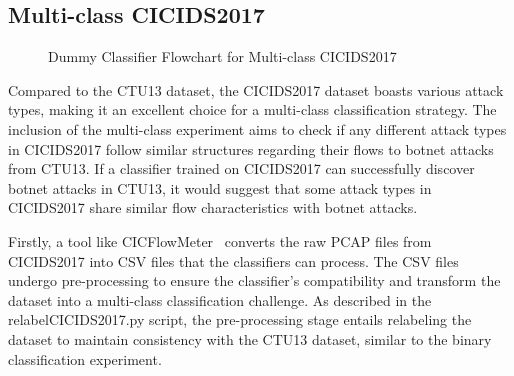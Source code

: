 \subsection{Multi-class CICIDS2017}\label{subsec:DummyClassifierMultiCICIDS2017}

\begin{figure}[H]
\centering
{}
\caption{Dummy Classifier Flowchart for Multi-class CICIDS2017}\label{fig:DummyRandomFlowMultiCICIDS2017}
\end{figure}

Compared to the CTU13 dataset, the CICIDS2017 dataset boasts various attack types, making it an excellent choice for a multi-class classification strategy. The inclusion of the multi-class experiment aims to check if any different attack types in CICIDS2017 follow similar structures regarding their flows to botnet attacks from CTU13. If a classifier trained on CICIDS2017 can successfully discover botnet attacks in CTU13, it would suggest that some attack types in CICIDS2017 share similar flow characteristics with botnet attacks.

Firstly, a tool like CICFlowMeter~\cite{lashkari2017characterization} converts the raw PCAP files from CICIDS2017 into CSV files that the classifiers can process. The CSV files undergo pre-processing to ensure the classifier's compatibility and transform the dataset into a multi-class classification challenge. As described in the relabelCICIDS2017.py script, the pre-processing stage entails relabeling the dataset to maintain consistency with the CTU13 dataset, similar to the binary classification experiment.

